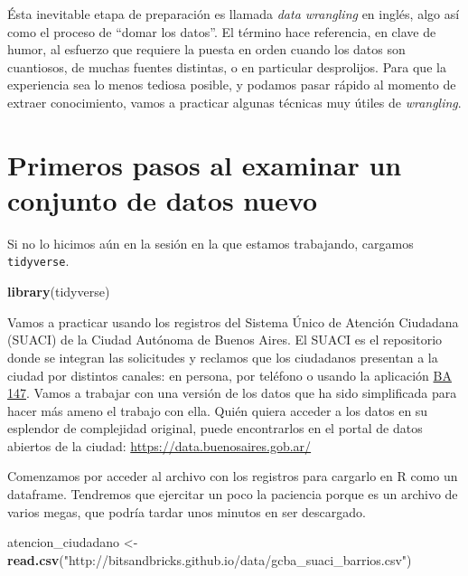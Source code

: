 \documentclass[spanish,]{book}
\newenvironment{Shaded}{\begin{snugshade}}{\end{snugshade}}
\newcommand{\KeywordTok}[1]{\textcolor[rgb]{0.13,0.29,0.53}{\textbf{#1}}}
\newcommand{\NormalTok}[1]{#1}
\newcommand{\StringTok}[1]{\textcolor[rgb]{0.31,0.60,0.02}{#1}}
\begin{document}
Ésta inevitable etapa de preparación es llamada \emph{data wrangling} en inglés, algo así como el proceso de ``domar los datos''. El término hace referencia, en clave de humor, al esfuerzo que requiere la puesta en orden cuando los datos son cuantiosos, de muchas fuentes distintas, o en particular desprolijos. Para que la experiencia sea lo menos tediosa posible, y podamos pasar rápido al momento de extraer conocimiento, vamos a practicar algunas técnicas muy útiles de \emph{wrangling}.

\hypertarget{primeros-pasos-al-examinar-un-conjunto-de-datos-nuevo}{%
\section{Primeros pasos al examinar un conjunto de datos nuevo}\label{primeros-pasos-al-examinar-un-conjunto-de-datos-nuevo}}

Si no lo hicimos aún en la sesión en la que estamos trabajando, cargamos \texttt{tidyverse}.

\begin{Shaded}
\begin{Highlighting}[]
\KeywordTok{library}\NormalTok{(tidyverse)}
\end{Highlighting}
\end{Shaded}

Vamos a practicar usando los registros del Sistema Único de Atención Ciudadana (SUACI) de la Ciudad Autónoma de Buenos Aires. El SUACI es el repositorio donde se integran las solicitudes y reclamos que los ciudadanos presentan a la ciudad por distintos canales: en persona, por teléfono o usando la aplicación \href{https://gestioncolaborativa.buenosaires.gob.ar/prestaciones}{BA 147}. Vamos a trabajar con una versión de los datos que ha sido simplificada para hacer más ameno el trabajo con ella. Quién quiera acceder a los datos en su esplendor de complejidad original, puede encontrarlos en el portal de datos abiertos de la ciudad: \url{https://data.buenosaires.gob.ar/}

Comenzamos por acceder al archivo con los registros para cargarlo en R como un dataframe. Tendremos que ejercitar un poco la paciencia porque es un archivo de varios megas, que podría tardar unos minutos en ser descargado.

\begin{Shaded}
\begin{Highlighting}[]
\NormalTok{atencion_ciudadano <-}\StringTok{ }\KeywordTok{read.csv}\NormalTok{(}\StringTok{"http://bitsandbricks.github.io/data/gcba_suaci_barrios.csv"}\NormalTok{)}
\end{Highlighting}
\end{Shaded}
\end{document}
